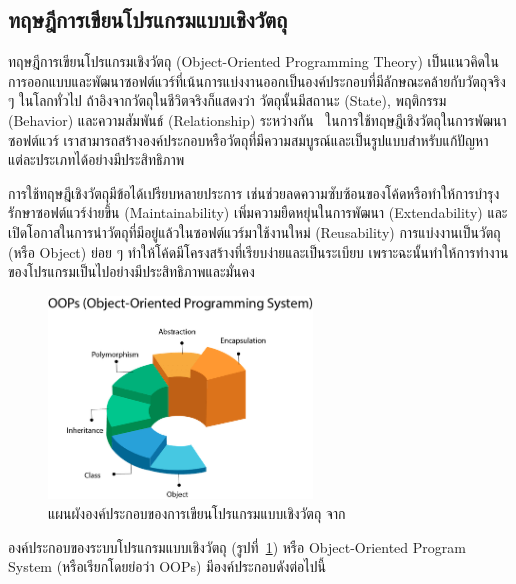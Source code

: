 \documentclass[12pt,one side,openright,a4paper]{cpe-thesis-th}
\newcommand{\thaijustify}[1]{%
  \par\hspace{30pt}\justifying
  #1
}
\begin{document}
\subsection{ทฤษฎีการเขียนโปรแกรมแบบเชิงวัตถุ}
\thaijustify{
  ทฤษฎีการเขียนโปรแกรมเชิงวัตถุ (Object-Oriented Programming Theory) เป็นแนวคิดในการออกแบบและพัฒนาซอฟต์แวร์ที่เน้นการแบ่งงานออกเป็นองค์ประกอบที่มีลักษณะคล้ายกับวัตถุจริง ๆ ในโลกทั่วไป ถ้าอิงจากวัตถุในชีวิตจริงก็แสดงว่า วัตถุนั้นมีสถานะ (State), พฤติกรรม (Behavior) และความสัมพันธ์ (Relationship) ระหว่างกัน~\cite{booch87} ในการใช้ทฤษฎีเชิงวัตถุในการพัฒนาซอฟต์แวร์ เราสามารถสร้างองค์ประกอบหรือวัตถุที่มีความสมบูรณ์และเป็นรูปแบบสำหรับแก้ปัญหาแต่ละประเภทได้อย่างมีประสิทธิภาพ~\cite{meyer2000}
}
\thaijustify{
  การใช้ทฤษฎีเชิงวัตถุมีข้อได้เปรียบหลายประการ เช่นช่วยลดความซับซ้อนของโค้ดหรือทำให้การบำรุงรักษาซอฟต์แวร์ง่ายขึ้น (Maintainability) เพิ่มความยืดหยุ่นในการพัฒนา (Extendability) และเปิดโอกาสในการนำวัตถุที่มีอยู่แล้วในซอฟต์แวร์มาใช้งานใหม่ (Reusability) การแบ่งงานเป็นวัตถุ (หรือ Object) ย่อย ๆ ทำให้โค้ดมีโครงสร้างที่เรียบง่ายและเป็นระเบียบ เพราะฉะนั้นทำให้การทำงานของโปรแกรมเป็นไปอย่างมีประสิทธิภาพและมั่นคง~\cite{meyer2000}
}
\begin{figure}[H]
  \centering
  \includegraphics[width=7cm]{figure/literature/oop-programming.png}
  \caption[แผนผังองค์ประกอบของ OOPs]{แผนผังองค์ประกอบของการเขียนโปรแกรมแบบเชิงวัตถุ จาก~\cite{apollo22oop}}
  \label{fig:oop-concept}
\end{figure}
\thaijustify{
  องค์ประกอบของระบบโปรแกรมแบบเชิงวัตถุ (รูปที่~\ref{fig:oop-concept}) หรือ Object-Oriented Program System (หรือเรียกโดยย่อว่า OOPs) มีองค์ประกอบดังต่อไปนี้
}
\end{document}
